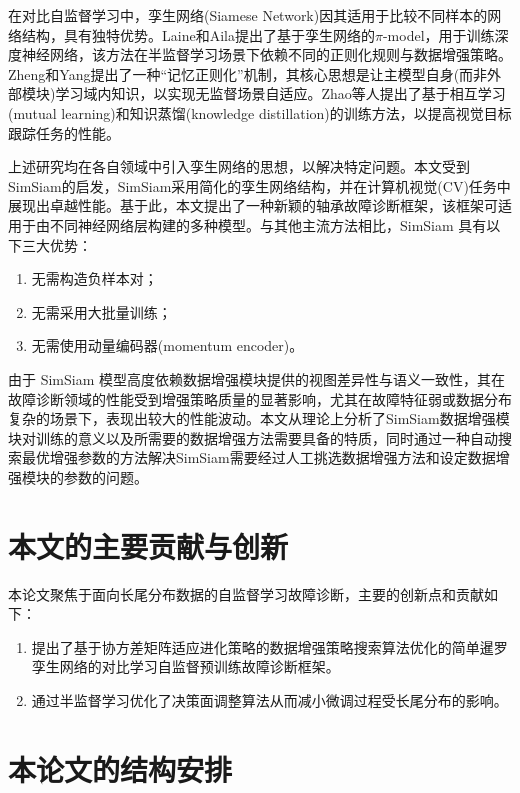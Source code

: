 \documentclass[master]{thesis-uestc}
\begin{document}
在对比自监督学习中，孪生网络(Siamese Network)因其适用于比较不同样本的网络结构，具有独特优势。Laine和Aila提出了基于孪生网络的$\pi$-model，用于训练深度神经网络，该方法在半监督学习场景下依赖不同的正则化规则与数据增强策略。Zheng和Yang提出了一种“记忆正则化”机制，其核心思想是让主模型自身(而非外部模块)学习域内知识，以实现无监督场景自适应。Zhao等人提出了基于相互学习(mutual learning)和知识蒸馏(knowledge distillation)的训练方法，以提高视觉目标跟踪任务的性能。

上述研究均在各自领域中引入孪生网络的思想，以解决特定问题。本文受到SimSiam的启发，SimSiam采用简化的孪生网络结构，并在计算机视觉(CV)任务中展现出卓越性能。基于此，本文提出了一种新颖的轴承故障诊断框架，该框架可适用于由不同神经网络层构建的多种模型。与其他主流方法相比，SimSiam 具有以下三大优势：
\begin{enumerate}[label={(\arabic*)}]
    \item 无需构造负样本对；
    \item 无需采用大批量训练；
    \item 无需使用动量编码器(momentum encoder)。
\end{enumerate}
由于 SimSiam 模型高度依赖数据增强模块提供的视图差异性与语义一致性，其在故障诊断领域的性能受到增强策略质量的显著影响，尤其在故障特征弱或数据分布复杂的场景下，表现出较大的性能波动。本文从理论上分析了SimSiam数据增强模块对训练的意义以及所需要的数据增强方法需要具备的特质，同时通过一种自动搜索最优增强参数的方法解决SimSiam需要经过人工挑选数据增强方法和设定数据增强模块的参数的问题。
\FloatBarrier  %
\section{本文的主要贡献与创新}

本论文聚焦于面向长尾分布数据的自监督学习故障诊断，主要的创新点和贡献如下：

\begin{enumerate}[label={(\arabic*)}]
    \item 提出了基于协方差矩阵适应进化策略的数据增强策略搜索算法优化的简单暹罗孪生网络的对比学习自监督预训练故障诊断框架。
    \item 通过半监督学习优化了决策面调整算法从而减小微调过程受长尾分布的影响。
\end{enumerate}

\section{本论文的结构安排}
\end{document}
